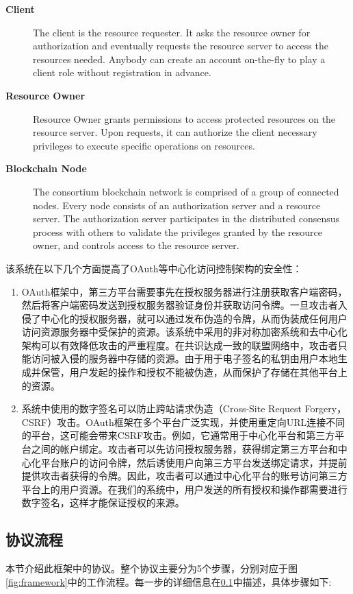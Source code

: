 \begin{description}
  \item[\textbf{Client}] The client is the resource requester. It asks the resource owner for authorization and eventually requests the resource server to access the resources needed. Anybody can create an account on-the-fly to play a client role without registration in advance.
  \item[\textbf{Resource Owner}] Resource Owner grants permissions to access protected resources on the resource server. Upon requests, it can authorize the client necessary privileges to execute specific operations on resources.
  \item[\textbf{Blockchain Node}] The consortium blockchain network is comprised of a group of connected nodes. Every node consists of an authorization server and a resource server. The authorization server participates in the distributed consensus process with others to validate the privileges granted by the resource owner, and controls access to the resource server.
\end{description}

该系统在以下几个方面提高了OAuth等中心化访问控制架构的安全性：

\begin{enumerate}
  \item OAuth框架中，第三方平台需要事先在授权服务器进行注册获取客户端密码，然后将客户端密码发送到授权服务器验证身份并获取访问令牌。一旦攻击者入侵了中心化的授权服务器，就可以通过发布伪造的令牌，从而伪装成任何用户访问资源服务器中受保护的资源。该系统中采用的非对称加密系统和去中心化架构可以有效降低攻击的严重程度。在共识达成一致的联盟网络中，攻击者只能访问被入侵的服务器中存储的资源。由于用于电子签名的私钥由用户本地生成并保管，用户发起的操作和授权不能被伪造，从而保护了存储在其他平台上的资源。

  \item 系统中使用的数字签名可以防止跨站请求伪造（Cross-Site Request Forgery，CSRF）攻击。OAuth框架在多个平台广泛实现，并使用重定向URL连接不同的平台，这可能会带来CSRF攻击。例如，它通常用于中心化平台和第三方平台之间的帐户绑定。攻击者可以先访问授权服务器，获得绑定第三方平台和中心化平台账户的访问令牌，然后诱使用户向第三方平台发送绑定请求，并提前提供攻击者获得的令牌。因此，攻击者可以通过中心化平台的账号访问第三方平台上的用户资源。在我们的系统中，用户发送的所有授权和操作都需要进行数字签名，这样才能保证授权的来源。
\end{enumerate}

\subsection{协议流程}
\label{sec:protocols}
本节介绍此框架中的协议。整个协议主要分为5个步骤，分别对应于图\ref{fig:framework}中的工作流程。每一步的详细信息在\ref{sec:protocols}中描述，具体步骤如下:


